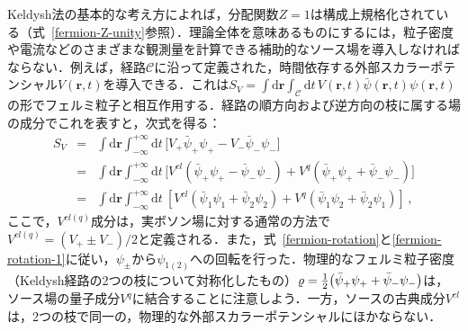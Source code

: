 \documentclass[a4paper,11pt]{ltjsarticle}
\def\d{\mathrm{d}}
\def\rt{(\mathbf{r},t)}
\begin{document}
Keldysh法の基本的な考え方によれば，分配関数$Z=1$は構成上規格化されている（式~\eqref{fermion-Z-unity}参照）．理論全体を意味あるものにするには，粒子密度や電流などのさまざまな観測量を計算できる補助的なソース場を導入しなければならない．例えば，経路$\mathcal{C}$に沿って定義された，時間依存する外部スカラーポテンシャル$V\rt$を導入できる．これは$S_{V}=\int\d\mathbf{r}\int_{\mathcal{C}}\d t\,
V\rt\bar{\psi}\rt\psi\rt$の形でフェルミ粒子と相互作用する．経路の順方向および逆方向の枝に属する場の成分でこれを表すと，次式を得る：
\begin{eqnarray}\label{fermion-SV}
S_{V}&=&\int\d\mathbf{r}\int^{+\infty}_{-\infty}\d
t\,\big[V_{+}\bar{\psi}_{+}\psi_{+}-V_{-}\bar{\psi}_{-}\psi_{-}\big]\nonumber
\\
&=&\int\d\mathbf{r} \int^{+\infty}_{-\infty}\d
t\,\big[V^{cl}(\bar{\psi}_{+}\psi_{+} - \bar{\psi}_{-}\psi_{-})+
V^{q}(\bar{\psi}_{+}\psi_{+} + \bar{\psi}_{-}\psi_{-})\big]\nonumber
\\
&=&\int\d\mathbf{r}\int^{+\infty}_{-\infty}\d t\
[V^{cl}(\bar{\psi}_{1}\psi_{1}+\bar{\psi}_{2}\psi_{2})+
V^{q}(\bar{\psi}_{1}\psi_{2}+\bar{\psi}_{2}\psi_{1})]\,,
\end{eqnarray}
ここで，$V^{cl(q)}$成分は，実ボソン場に対する通常の方法で$V^{cl(q)} = (V_{+}\pm V_{-})/2$と定義される．また，式~\eqref{fermion-rotation}と\eqref{fermion-rotation-1}に従い，$\psi_{\pm}$から$\psi_{1(2)}$への回転を行った．物理的なフェルミ粒子密度（Keldysh経路の2つの枝について対称化したもの）$\varrho = {1\over 2} \big(
\bar\psi_{+}\psi_{+}+ \bar\psi_{-}\psi_{-} \big)$は，ソース場の量子成分$V^q$に結合することに注意しよう．一方，ソースの古典成分$V^{cl}$は，2つの枝で同一の，物理的な外部スカラーポテンシャルにほかならない．
\end{document}
